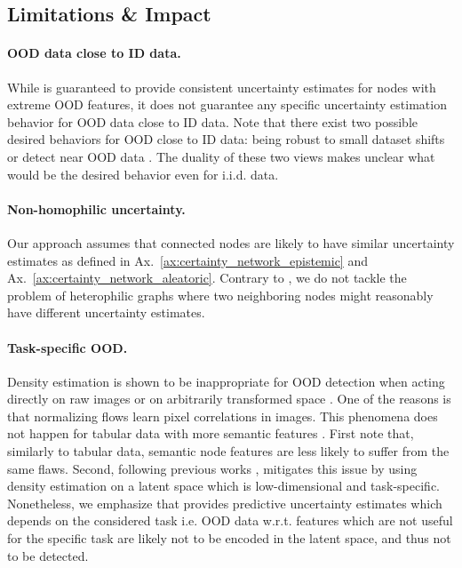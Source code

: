 \subsection{Limitations \& Impact} 
\label{sec:limitations_009}

\paragraph{OOD data close to ID data.} While \GPNacro{} is guaranteed to provide consistent uncertainty estimates for nodes with extreme OOD features, it does not guarantee any specific uncertainty estimation behavior for OOD data close to ID data. Note that there exist two possible desired behaviors for OOD close to ID data: being robust to small dataset shifts \citep{Ovadia2019, confidence-calibrated-adversarial} or detect near OOD data \citep{contrastive-ood, robustness-uncertainty-dirichlet, attack-detection}. The duality of these two views makes unclear what would be the desired behavior even for i.i.d. data.

\paragraph{Non-homophilic uncertainty.} Our approach assumes that connected nodes are likely to have similar uncertainty estimates as defined in Ax.~\ref{ax:certainty_network_epistemic} and Ax.~\ref{ax:certainty_network_aleatoric}. Contrary to \cite{heterophily-gnn}, we do not tackle the problem of heterophilic graphs where two neighboring nodes might reasonably have different uncertainty estimates. 

\paragraph{Task-specific OOD.} Density estimation is shown to be inappropriate for OOD detection when acting directly on raw images \cite{typicality_OOD_generative, anomaly-detection, deep-generative} or on arbitrarily transformed space \cite{perfect-density-no-ood-guarantee}. One of the reasons is that normalizing flows learn pixel correlations in images. This phenomena  does not happen for tabular data with more semantic features \citep{Kirichenko2020}. First note that, similarly to tabular data, semantic node features are less likely to suffer from the same flaws. Second, following previous works \citep{charpentier2020, NatPN2021, Kirichenko2020, density-states-ood, contrastive-ood}, \GPNacro{} mitigates this issue by using density estimation on a latent space which is low-dimensional and task-specific. Nonetheless, we emphasize that \GPNacro{} provides predictive uncertainty estimates which depends on the considered task i.e. OOD data w.r.t. features which are not useful for the specific task are likely not to be encoded in the latent space, and thus not to be detected.

